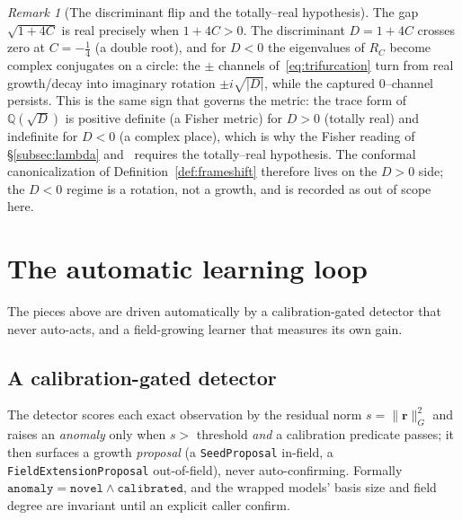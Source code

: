 \documentclass[11pt]{article}
\theoremstyle{plain}
\theoremstyle{definition}
\theoremstyle{remark}
\newtheorem{remark}[theorem]{Remark}
\newcommand{\Q}{\mathbb{Q}}
\newcommand{\rr}{\mathbf{r}}
\newcommand{\GG}{G}
\begin{document}
\begin{remark}[The discriminant flip and the totally--real hypothesis]\label{rem:flip}
The gap $\sqrt{1+4C}$ is real precisely when $1+4C>0$. The discriminant $D=1+4C$ crosses zero at $C=-\tfrac14$
(a double root), and for $D<0$ the eigenvalues of $R_C$ become complex conjugates on a circle: the $\pm$ channels
of~\eqref{eq:trifurcation} turn from real growth/decay into imaginary rotation $\pm i\sqrt{|D|}$, while the
captured $0$--channel persists. This is the same sign that governs the metric: the trace form of $\Q(\sqrt D)$ is
positive definite (a Fisher metric) for $D>0$ (totally real) and indefinite for $D<0$ (a complex place), which is
why the Fisher reading of \S\ref{subsec:lambda} and~\cite{VectorSubstrate} requires the totally--real hypothesis.
The conformal canonicalization of Definition~\ref{def:frameshift} therefore lives on the $D>0$ side; the
$D<0$ regime is a rotation, not a growth, and is recorded as out of scope here.
\end{remark}

\section{The automatic learning loop}\label{sec:loop}

The pieces above are driven automatically by a calibration-gated detector that never auto-acts, and a
field-growing learner that measures its own gain.

\subsection{A calibration-gated detector}
The detector scores each exact observation by the residual norm $s=\lVert\rr\rVert_\GG^2$ and raises an
\emph{anomaly} only when $s>$ threshold \emph{and} a calibration predicate passes; it then surfaces a growth
\emph{proposal} (a \texttt{SeedProposal} in-field, a \texttt{FieldExtensionProposal} out-of-field), never
auto-confirming. Formally $\texttt{anomaly}=\texttt{novel}\wedge\texttt{calibrated}$, and the wrapped models'
basis size and field degree are invariant until an explicit caller confirm.
\end{document}
